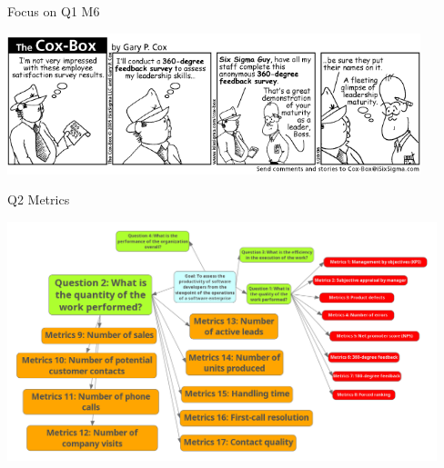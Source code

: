 \documentclass{beamer}
\begin{document}
\begin{frame}{\centerline{Focus on Q1 M6}}

\begin{center}
\includegraphics[width=120mm]{A2022.ScaleDeiDati/20180904_CaseStudy_GoalQuestions_M2_360DegreeEmployeePerformanceMetrics.png}
\newline
\end{center}

\end{frame}

\begin{frame}{\centerline{Q2 Metrics}}

\begin{center}
\includegraphics[width=125mm]{A2022.ScaleDeiDati/20180904_CaseStudy_GoalQuestions_M3.png}
\newline
\end{center}

\end{frame}
\end{document}
